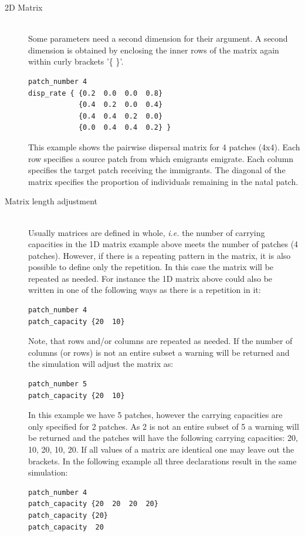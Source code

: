 \documentclass[letterpaper,12pt,oneside]{book}
\begin{document}
\begin{description}
\begin{description}
\item[2D Matrix]\hspace*{\fill}\\
Some parameters need a second dimension for their argument. A second dimension is obtained by enclosing the inner rows of the matrix again within curly brackets '\{ \}'.
\begin{lstlisting}[frame=single]
patch_number 4
disp_rate { {0.2  0.0  0.0  0.8}
            {0.4  0.2  0.0  0.4}
            {0.4  0.4  0.2  0.0}
            {0.0  0.4  0.4  0.2} }
\end{lstlisting}
This example shows the pairwise dispersal matrix for 4 patches (4x4). Each row specifies a source patch from which emigrants emigrate. Each column specifies the target patch receiving the immigrants. The diagonal of the matrix specifies the proportion of individuals remaining in the natal patch.

\item[Matrix length adjustment]\hspace*{\fill}\\
Usually matrices are defined in whole, \textit{i.e.} the number of carrying capacities in the 1D matrix example above meets the number of patches (4 patches). However, if there is a repeating pattern in the matrix, it is also possible to define only the repetition. In this case the matrix will be repeated as needed. For instance the 1D matrix above could also be written in one of the following ways as there is a repetition in it: 
\begin{lstlisting}[frame=single]
patch_number 4
patch_capacity {20  10}
\end{lstlisting}
Note, that rows and/or columns are repeated as needed. If the number of columns (or rows) is not an entire subset a warning will be returned and the simulation will adjust the matrix as:
\begin{lstlisting}[frame=single]
patch_number 5
patch_capacity {20  10}
\end{lstlisting}
In this example we have 5 patches, however the carrying capacities are only specified for 2 patches. As 2 is not an entire subset of 5 a warning will be returned and the patches will have the following carrying capacities: 20, 10, 20, 10, 20. If all values of a matrix are identical one may leave out the brackets. In the following example all three declarations result in the same simulation:
\begin{lstlisting}[frame=single]
patch_number 4
patch_capacity {20  20  20  20}
patch_capacity {20}
patch_capacity  20
\end{lstlisting}



\end{description}
\end{description}
\end{document}

